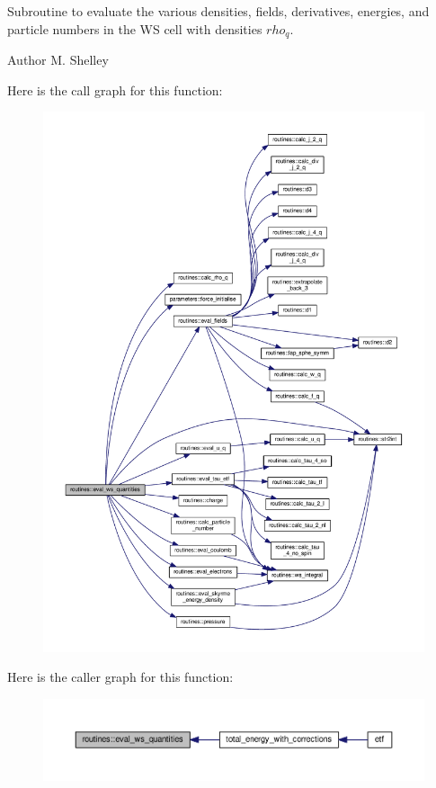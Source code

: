 Subroutine to evaluate the various densities, fields, derivatives, energies, and particle numbers in the WS cell with densities $rho_q$. 

\begin{DoxyAuthor}{Author}
M. Shelley 
\end{DoxyAuthor}
Here is the call graph for this function\+:
\nopagebreak
\begin{figure}[H]
\begin{center}
\leavevmode
\includegraphics[width=350pt]{namespaceroutines_a93de76f3b26ead66893f46dc4892dbcb_cgraph}
\end{center}
\end{figure}
Here is the caller graph for this function\+:
\nopagebreak
\begin{figure}[H]
\begin{center}
\leavevmode
\includegraphics[width=350pt]{namespaceroutines_a93de76f3b26ead66893f46dc4892dbcb_icgraph}
\end{center}
\end{figure}
\mbox{\label{namespaceroutines_af143340288720f8019e944ec7110a84e}} 
